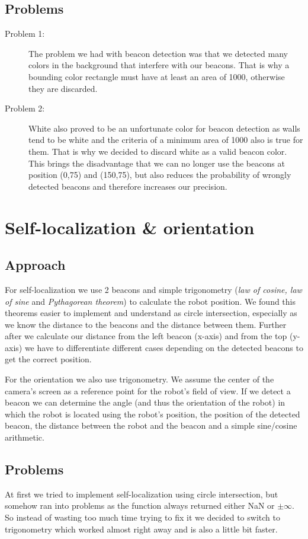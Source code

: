 \documentclass[703031]{iisreport}
\begin{document}
\subsection{Problems}

	\begin{description}
		\item [Problem 1:] The problem we had with beacon detection was that we detected many colors in the background that interfere with our beacons. That is why a bounding color rectangle must have at least an area of 1000, otherwise they are discarded.
		\item [Problem 2:] White also proved to be an unfortunate color for beacon detection as walls tend to be white and the criteria of a minimum area of 1000 also is true for them. That is why we decided to discard white as a valid beacon color. This brings the disadvantage that we can no longer use the beacons at position (0,75) and (150,75), but also reduces the probability of wrongly detected beacons and therefore increases our precision.
	\end{description}


\section{Self-localization \& orientation}
\label{sl}
\subsection{Approach}
For self-localization we use 2 beacons and simple trigonometry (\emph{law of cosine, law of sine} and \emph{Pythagorean theorem}) to calculate the robot position. We found this theorems easier to implement and understand as circle intersection, especially as we know the distance to the beacons and the distance between them.
Further after we calculate our distance from the left beacon (x-axis) and from the top (y-axis) we have to differentiate different cases depending on the detected beacons to get the correct position.

For the orientation we also use trigonometry. We assume the center of the camera's screen as a reference point for the robot's field of view. If we detect a beacon we can determine the angle (and thus the orientation of the robot) in which the robot is located using the robot's position, the position of the detected beacon, the distance between the robot and the beacon and a simple sine/cosine arithmetic.

\subsection{Problems}
At first we tried to implement self-localization using circle intersection, but somehow ran into problems as the function always returned either NaN or $\pm \infty$. So instead of wasting too much time trying to fix it we decided to switch to trigonometry which worked almost right away and is also a little bit faster.
\end{document}
